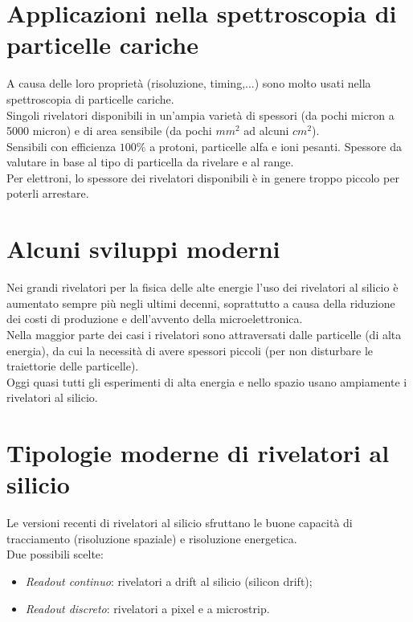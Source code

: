 \documentclass[12pt, letterpaper]{book}
\begin{document}
\section{Applicazioni nella spettroscopia di particelle cariche}
A causa delle loro proprietà (risoluzione, timing,...) sono molto usati nella spettroscopia di particelle cariche.\\
Singoli rivelatori disponibili in un’ampia varietà di spessori (da pochi micron a 5000 micron) e di area sensibile (da pochi $mm^2$ ad alcuni $cm^2$).\\
Sensibili con efficienza $100\%$ a protoni, particelle alfa e ioni pesanti. Spessore da valutare in base al tipo di particella da rivelare e al range.\\
Per elettroni, lo spessore dei rivelatori disponibili è in genere troppo piccolo per poterli arrestare.

\section{Alcuni sviluppi moderni}
Nei grandi rivelatori per la fisica delle alte energie l’uso dei rivelatori al silicio è aumentato sempre più negli ultimi decenni, soprattutto a causa della riduzione dei costi di produzione e dell'avvento della microelettronica.\\
Nella maggior parte dei casi i rivelatori sono attraversati dalle particelle (di alta energia), da cui la necessità di avere spessori piccoli (per non disturbare le traiettorie delle particelle).\\
Oggi quasi tutti gli esperimenti di alta energia e nello spazio usano ampiamente i rivelatori al silicio.

\newpage
\section{Tipologie moderne di rivelatori al silicio}
Le versioni recenti di rivelatori al silicio sfruttano le buone capacità di tracciamento (risoluzione spaziale) e risoluzione energetica.\\
Due possibili scelte:
\begin{itemize}
    \item \textit{Readout continuo}: rivelatori a drift al silicio (silicon drift);
    \item \textit{Readout discreto}: rivelatori a pixel e a microstrip.
\end{itemize}
\end{document}
